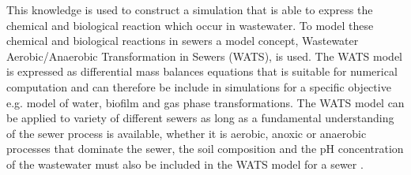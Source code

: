 This knowledge is used to construct a simulation that is able to express the chemical and biological reaction which occur in wastewater. %
To model these chemical and biological reactions in sewers a model concept, Wastewater Aerobic/Anaerobic Transformation in Sewers (WATS), is used. The WATS model is expressed as differential mass balances equations that is suitable for numerical computation and can therefore be include in simulations for a specific objective e.g. model of water, biofilm and gas phase transformations. The WATS model can be applied to variety of different sewers as long as a fundamental understanding of the sewer process is available, whether it is aerobic, anoxic or anaerobic processes that dominate the sewer, the soil composition and the pH concentration of the wastewater must also be included in the WATS model for a sewer \cite{Sewer_processes}.     






